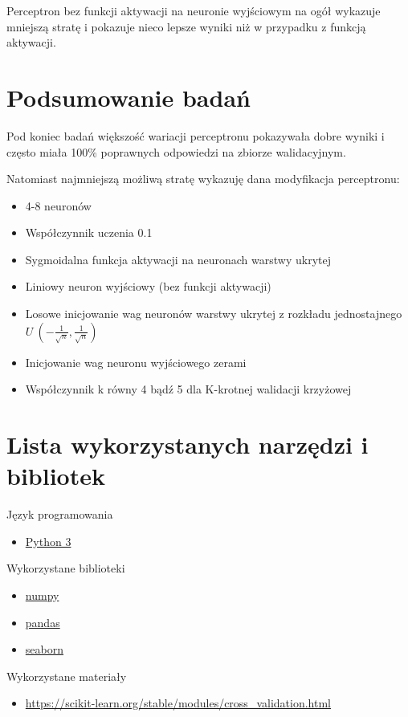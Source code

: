 \documentclass[12pt,a4paper]{article}
\begin{document}
Perceptron bez funkcji aktywacji na neuronie wyjściowym na ogół wykazuje mniejszą stratę i pokazuje nieco lepsze wyniki niż w przypadku z funkcją aktywacji.

\section{Podsumowanie badań}

Pod koniec badań większość wariacji perceptronu pokazywała dobre wyniki i często miała 100\% poprawnych odpowiedzi na zbiorze walidacyjnym.

Natomiast najmniejszą możliwą stratę wykazuję dana modyfikacja perceptronu:

\begin{itemize}
  \item   4-8 neuronów
  \item   Współczynnik uczenia 0.1
  \item   Sygmoidalna funkcja aktywacji na neuronach warstwy ukrytej
  \item   Liniowy neuron wyjściowy (bez funkcji aktywacji)
  \item   Losowe inicjowanie wag neuronów warstwy ukrytej z rozkładu jednostajnego \(U ~ (-\frac{1}{\sqrt{n}}, \frac{1}{\sqrt{n}})\)
  \item   Inicjowanie wag neuronu wyjściowego zerami
  \item   Współczynnik k równy 4 bądź 5 dla K-krotnej walidacji krzyżowej
\end{itemize}

\section{Lista wykorzystanych narzędzi i bibliotek}

Język programowania

\begin{itemize}
	\item   \href{https://www.python.org/}{Python 3}
\end{itemize}
Wykorzystane biblioteki

\begin{itemize}
	\item   \href{https://numpy.org/}{numpy}
	\item   \href{https://pandas.pydata.org/}{pandas}
	\item   \href{https://seaborn.pydata.org/}{seaborn}
\end{itemize}
Wykorzystane materiały

\begin{itemize}
	\item   \url{https://scikit-learn.org/stable/modules/cross_validation.html}
\end{itemize}
\end{document}
